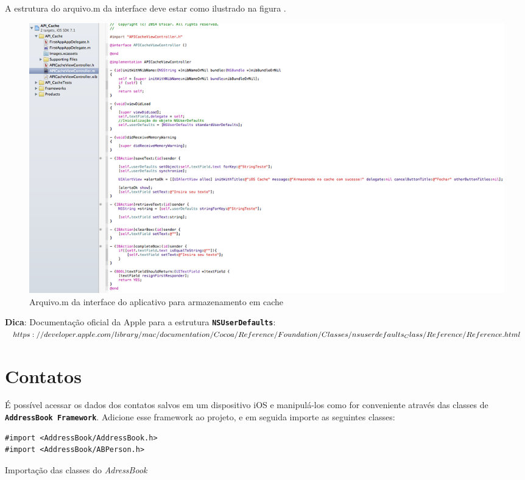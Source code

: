 \documentclass[a4paper,12pt,brazil,doubleside]{book}
\begin{document}
\begin{singlespace}
A estrutura do arquivo.m da interface deve estar como ilustrado na figura .

\begin{figure}[H]
  \centering
  \includegraphics[width=.90\textwidth]{figuras/4/app_interface_estrutura_m.png}
  \caption{Arquivo.m da interface do aplicativo para armazenamento em cache}
  \label{fig:app_interface_estrutura_m}
\end{figure}

\begin{framed}

\textbf{Dica}: Documentação oficial da Apple para a estrutura \texttt{\textbf{NSUserDefaults}}:\\
\(https://developer.apple.com/library/mac/documentation/Cocoa/Reference\\/Foundation/Classes/nsuserdefaults_Class/Reference/Reference.html
\)
\end{framed}


\section{Contatos}


É possível acessar os dados dos contatos salvos em um dispositivo iOS e manipulá-los como for conveniente através das classes de \texttt{\textbf{AddressBook Framework}}. Adicione esse framework ao projeto, e em seguida importe as seguintes classes:

\begin{listing}[H]
\begin{verbatim}
#import <AddressBook/AddressBook.h>
#import <AddressBook/ABPerson.h>
\end{verbatim}
\caption{Importação das classes do \emph{AdressBook}}
\end{listing}



\end{singlespace}
\end{document}
